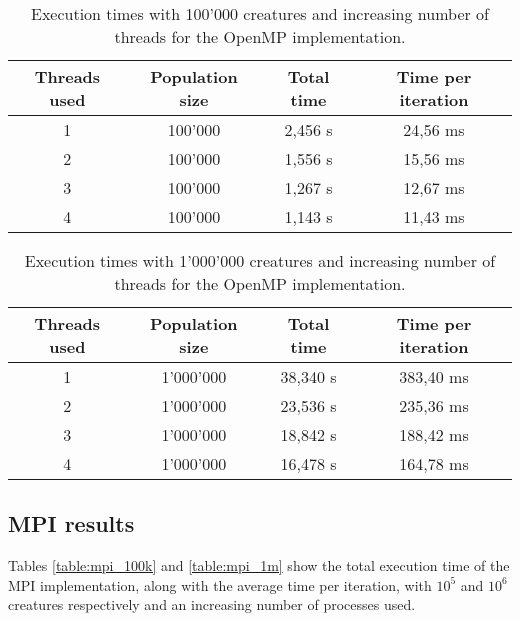 \documentclass[12pt,a4paper,oneside]{article}
\begin{document}
	\begin{table}[!ht]
		\centering
		\begin{tabular}{|c|c|c|c|}
		\hline
		Threads used & Population size & Total time & Time per iteration \\ \hline
		1                 & 100'000             & 2,456 s            & 24,56 ms                    \\ \hline
		2                 & 100'000             & 1,556 s            & 15,56 ms                    \\ \hline
		3                 & 100'000             & 1,267 s            & 12,67 ms                    \\ \hline
		4                 & 100'000             & 1,143 s            & 11,43 ms                    \\ \hline
		\end{tabular}
		\caption{Execution times with 100'000 creatures and increasing number of threads for the OpenMP implementation.}
		\label{table:omp_100k}
	\end{table}

	\begin{table}[!ht]
		\centering
		\begin{tabular}{|c|c|c|c|}
		\hline
		Threads used & Population size & Total time & Time per iteration \\ \hline
		1                 & 1'000'000           & 38,340 s           & 383,40 ms                   \\ \hline
		2                 & 1'000'000           & 23,536 s           & 235,36 ms                   \\ \hline
		3                 & 1'000'000           & 18,842 s           & 188,42 ms                   \\ \hline
		4                 & 1'000'000           & 16,478 s           & 164,78 ms                   \\ \hline
		\end{tabular}
		\caption{Execution times with 1'000'000 creatures and increasing number of threads for the OpenMP implementation.}
		\label{table:omp_1m}
	\end{table}

	\subsection{MPI results}
	Tables \ref{table:mpi_100k} and \ref{table:mpi_1m} show the total execution time of the MPI implementation, along with the average time per iteration, with $10^5$ and $10^6$ creatures respectively and an increasing number of processes used.
\end{document}
